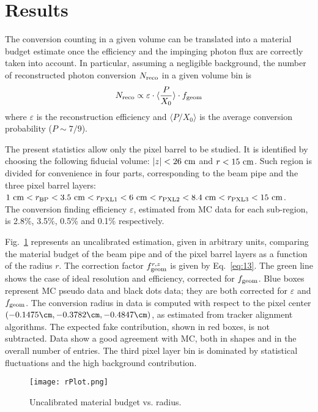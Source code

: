 \section{Results}
\label{results}

The conversion counting in a given volume can be translated into a material budget estimate once the efficiency and the impinging 
photon flux are correctly taken into account. 
In particular, assuming a negligible background, the number of reconstructed photon conversion $N_{\rm reco}$ in a given volume bin is
\begin{equation}
N_{\rm reco} \propto \varepsilon \cdot \langle \frac{P}{X_0} \rangle \cdot f_{\rm geom}
\end{equation}
where $\varepsilon$ is the reconstruction efficiency and $\langle P/{X_0} \rangle$ is the average conversion probability ($P\sim 7/9$).

The present statistics allow only the pixel barrel to be studied. 
It is identified by choosing the following fiducial volume: $|z|<26~{\rm cm}$ and $r<15~{\rm cm}$.
Such region is divided for convenience in four parts, corresponding to the beam pipe and the three pixel barrel layers:\\
$1~{\rm cm}<r_{\rm BP}<3.5~{\rm cm}<r_{\rm PXL1}<6~{\rm cm}<r_{\rm PXL2}<8.4~{\rm cm}<r_{\rm PXL3}<15~{\rm cm}$. \\
The conversion finding efficiency $\varepsilon$, estimated from MC data for each sub-region, is 2.8\%, 3.5\%, 0.5\% and 0.1\% respectively.

Fig.~\ref{figMBvsr} represents an uncalibrated estimation, given in arbitrary units, 
comparing the material budget of the beam pipe and of the pixel barrel layers as a function of the radius $r$.
The correction factor $f^{r, z}_{\rm geom}$ is given by Eq.~\ref{eq:13}.
The green line shows the case of ideal resolution and efficiency, corrected for $f_{\rm geom}$.
Blue boxes represent MC pseudo data and black dots data; they are both corrected for $\varepsilon$ and $f_{\rm geom}$.
The conversion radius in data is computed with respect to the pixel center $(-0.1475\cm, -0.3782\cm, -0.4847\cm)$, 
as estimated from tracker alignment algorithms. 
The expected fake contribution, shown in red boxes, is not subtracted. 
Data show a good agreement with MC, both in shapes and in the overall number of entries.
The third pixel layer bin is dominated by statistical fluctuations and the high background contribution.

\begin{figure}[!htbp]
 \begin{center}
   \texttt{[image: rPlot.png]}
 \end{center}
 \caption{Uncalibrated material budget vs. radius.}
\label{figMBvsr}
\end{figure}

